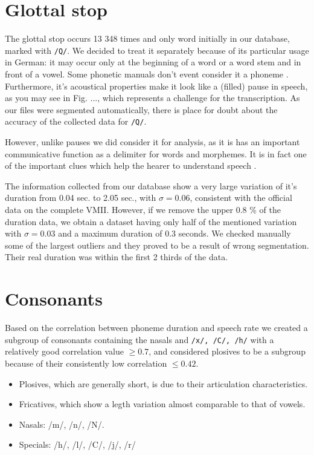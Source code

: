 \documentclass[a4paper]{scrreprt}
\begin{document}
\section{Glottal stop}
The glottal stop occurs 13 348 times and only word initially in our database, marked with \texttt{/Q/}. We decided to treat it separately because of its particular usage in German: it may occur only at the beginning of a word or a word stem and in front of a vowel. Some phonetic manuals don't event consider it a phoneme \cite{Ternes2012}. Furthermore, it's acoustical properties make it look like a (filled) pause in speech, as you may see in Fig. ..., which represents a challenge for the transcription. As our files were segmented automatically, there is place for doubt about the accuracy of the collected data for \texttt{/Q/}.

However, unlike pauses we did consider it  for analysis, as it is has an important communicative function as a delimiter for words and morphemes. It is in fact one of the important clues which help the hearer to understand speech \cite{Ternes2012}. 

The information collected from our database show a very large variation of it's duration from 0.04 sec. to 2.05 sec., with $\sigma = 0.06$, consistent with the official data on the complete VMII. However, if we remove the upper 0.8 \% of the duration data, we obtain a dataset having only half of the mentioned variation with $\sigma = 0.03$ and a maximum duration of 0.3 seconds. We checked manually some of the largest outliers and they proved to be a result of wrong segmentation. Their real duration was within the first 2 thirds of the data.

\section{Consonants}
Based on the correlation between phoneme duration and speech rate we created a subgroup of consonants containing the nasals and \texttt{/x/, /C/, /h/} with a relatively good correlation value $\geq 0.7$, and considered plosives to be a subgroup because of their consistently low correlation $\leq 0.42$.
\begin{itemize}
	\item Plosives, which are generally short, is due to their articulation characteristics.
	\item Fricatives, which show a legth variation almost comparable to that of vowels.
	\item Nasals: /m/, /n/, /N/.
	\item Specials: /h/, /l/, /C/, /j/, /r/
\end{itemize}
\end{document}
